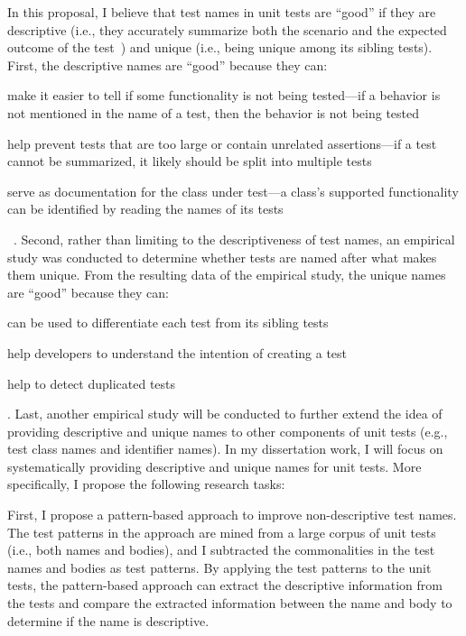 In this proposal, I believe that test names in unit tests are \enquote{good} if they are descriptive (i.e., they accurately summarize both the scenario and the expected outcome of the test~\cite{trenk14}) and unique (i.e., being unique among its sibling tests).
%
First, the descriptive names are \enquote{good} because they can:
\begin{enumerate*}
\item make it easier to tell if some functionality is not being tested---if a behavior is not mentioned in the name of a test, then the behavior is not being tested
\item help prevent tests that are too large or contain unrelated assertions---if a test cannot be summarized, it likely should be split into multiple tests
\item serve as documentation for the class under test---a class's supported functionality can be identified by reading the names of its tests
\end{enumerate*}~\cite{zhang2015automatically}.
%
Second, rather than limiting to the descriptiveness of test names, an empirical study was conducted to determine whether tests are named after what makes them unique.
%
From the resulting data of the empirical study, the unique names are \enquote{good} because they can:
\begin{enumerate*}
\item can be used to differentiate each test from its sibling tests
\item help developers to understand the intention of creating a test
\item help to detect duplicated tests
\end{enumerate*}.
%
Last, another empirical study will be conducted to further extend the idea of providing descriptive and unique names to other components of unit tests (e.g., test class names and identifier names).
%
In my dissertation work, I will focus on systematically providing descriptive and unique names for unit tests.
%
More specifically, I propose the following research tasks:


First, I propose a pattern-based approach to improve non-descriptive test names.
%
The test patterns in the approach are mined from a large corpus of unit tests (i.e., both names and bodies), and I subtracted the commonalities in the test names and bodies as test patterns.
%
By applying the test patterns to the unit tests, the pattern-based approach can extract the descriptive information from the tests and compare the extracted information between the name and body to determine if the name is descriptive.



